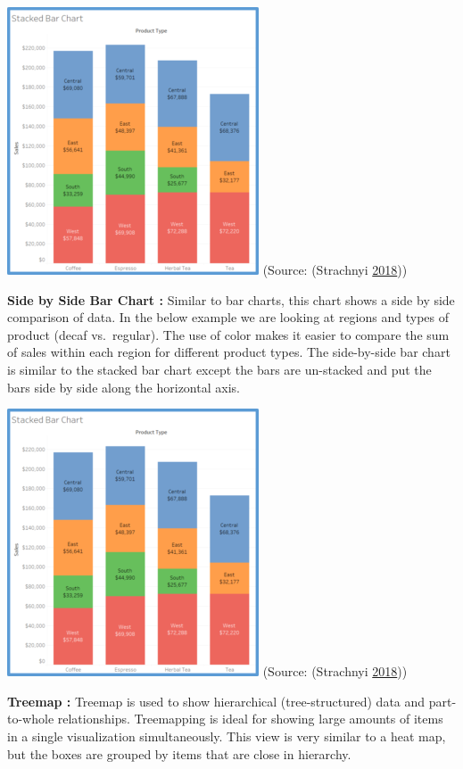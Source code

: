 \documentclass[]{book}
\begin{document}
\includegraphics{images/3.2.2_Stacked_bar_chart.png}
(Source: (Strachnyi \protect\hyperlink{ref-Charts_CheatSheet}{2018}))

\textbf{Side by Side Bar Chart :} Similar to bar charts, this chart shows a side by side comparison of data. In the below example we are looking at regions and types of product (decaf vs.~regular). The use of color makes it easier to compare the sum of sales within each region for different product types. The side-by-side bar chart is similar to the stacked bar chart except the bars are un-stacked and put the bars side by side along the horizontal axis.

\includegraphics{images/3.2.2_Stacked_bar_chart.png}
(Source: (Strachnyi \protect\hyperlink{ref-Charts_CheatSheet}{2018}))

\textbf{Treemap :} Treemap is used to show hierarchical (tree-structured) data and part-to-whole relationships. Treemapping is ideal for showing large amounts of items in a single visualization simultaneously. This view is very similar to a heat map, but the boxes are grouped by items that are close in hierarchy.
\end{document}
